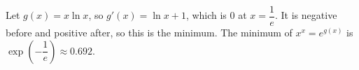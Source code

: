 Let $g(x)=x\ln x$, so $g'(x)=\ln x+1$, which is $0$ at $x=\dfrac1e$. It is negative before and positive after, so this is the minimum. The minimum of $x^x=e^{g(x)}$ is $\boxed{\exp\left(-\dfrac1e\right)}\approx0.692$.
